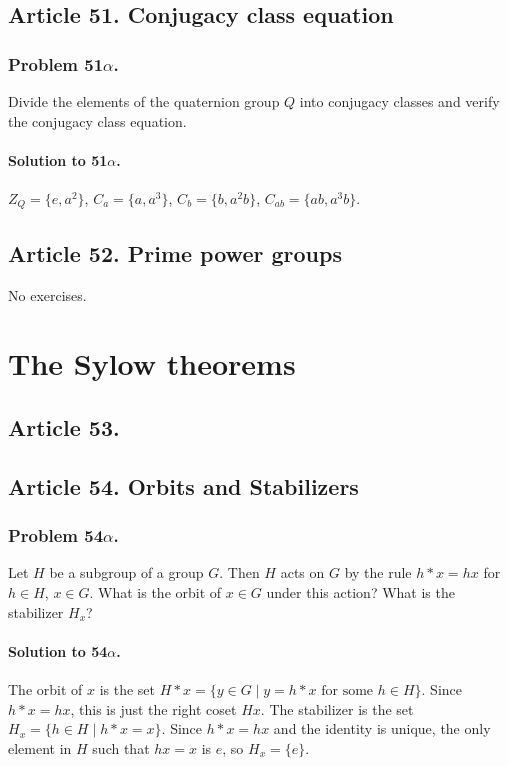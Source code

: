 \subsection{Article 51. Conjugacy class equation}
\subsubsection{Problem 51$\alpha$.}
Divide the elements of the quaternion group $Q$ into conjugacy classes and
verify the conjugacy class equation.

\paragraph*{Solution to 51$\alpha$.}
$Z_Q = \{ e, a^2 \}$, $C_a = \{ a, a^3 \}$, $C_b = \{ b, a^2 b \}$,
$C_{ab} = \{ ab, a^3b \}$.

\subsection{Article 52. Prime power groups}

No exercises.


\section{The Sylow theorems}


\subsection{Article 53.}

\subsection{Article 54. Orbits and Stabilizers}
\subsubsection{Problem 54$\alpha$.}
Let $H$ be a subgroup of a group $G$. Then $H$ acts on $G$ by the rule
$h * x = hx$ for $h \in H$, $x \in G$. What is the orbit of $x \in G$ under
this action? What is the stabilizer $H_x$?

\paragraph*{Solution to 54$\alpha$.}
The orbit of $x$ is the set $H * x = \{ y \in G \mid y = h * x \mbox{ for some }
h \in H \} $. Since $ h * x = hx$, this is just the right coset $Hx$. The
stabilizer is the set $ H_x = \{ h \in H \mid h*x = x \}$. Since $h*x=hx$ and
the identity is unique, the only element in $H$ such that $hx =x$ is $e$, so
$H_x = \{ e \}$.

